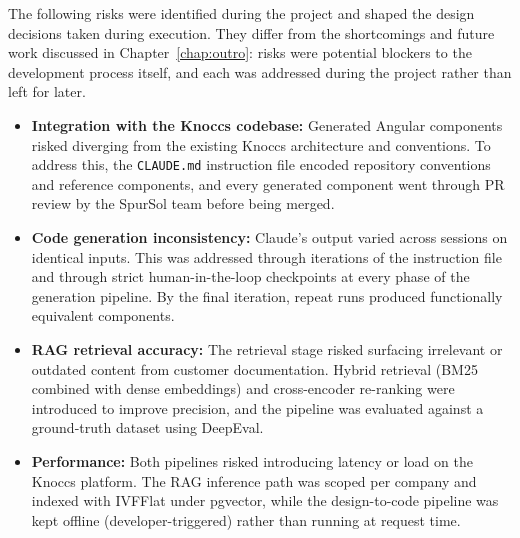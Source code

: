 The following risks were identified during the project and shaped the design decisions taken during execution. They differ from the shortcomings and future work discussed in Chapter~\ref{chap:outro}: risks were potential blockers to the development process itself, and each was addressed during the project rather than left for later.

\begin{itemize}
    \item \textbf{Integration with the Knoccs codebase:} Generated Angular components risked diverging from the existing Knoccs architecture and conventions. To address this, the \texttt{CLAUDE.md} instruction file encoded repository conventions and reference components, and every generated component went through PR review by the SpurSol team before being merged.
    \item \textbf{Code generation inconsistency:} Claude's output varied across sessions on identical inputs. This was addressed through iterations of the instruction file and through strict human-in-the-loop checkpoints at every phase of the generation pipeline. By the final iteration, repeat runs produced functionally equivalent components.
    \item \textbf{RAG retrieval accuracy:} The retrieval stage risked surfacing irrelevant or outdated content from customer documentation. Hybrid retrieval (BM25 combined with dense embeddings) and cross-encoder re-ranking were introduced to improve precision, and the pipeline was evaluated against a ground-truth dataset using DeepEval.
    \item \textbf{Performance:} Both pipelines risked introducing latency or load on the Knoccs platform. The RAG inference path was scoped per company and indexed with IVFFlat under pgvector, while the design-to-code pipeline was kept offline (developer-triggered) rather than running at request time.
\end{itemize}



